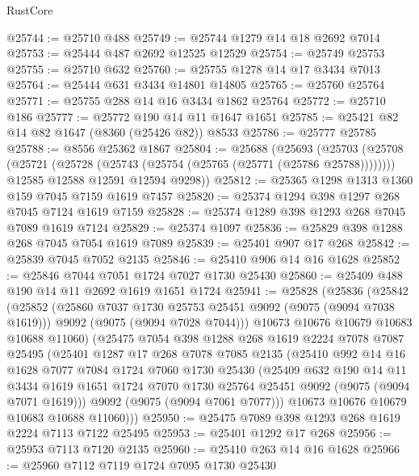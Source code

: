 \begin{lexlean}{RustCore}
\begin{coremodule}
@25744 := @25710 @488
@25749 := @25744 @1279 @14 @18 @2692 @7014
@25753 := @25444 @487 @2692 @12525 @12529
@25754 := @25749 @25753
@25755 := @25710 @632
@25760 := @25755 @1278 @14 @17 @3434 @7013
@25764 := @25444 @631 @3434 @14801 @14805
@25765 := @25760 @25764
@25771 := @25755 @288 @14 @16 @3434 @1862 @25764
@25772 := @25710 @186
@25777 := @25772 @190 @14 @11 @1647 @1651
@25785 := @25421 @82 @14 @82 @1647 (@8360 (@25426 @82)) @8533
@25786 := @25777 @25785
@25788 := @8556 @25362 @1867
@25804 := @25688
    (@25693
      (@25703
        (@25708 (@25721 (@25728 (@25743 (@25754 (@25765 (@25771 (@25786 @25788))))))))
        @12585
        @12588
        @12591
        @12594
        @9298))
@25812 := @25365 @1298 @1313 @1360 @159 @7045 @7159 @1619 @7457
@25820 := @25374 @1294 @398 @1297 @268 @7045 @7124 @1619 @7159
@25828 := @25374 @1289 @398 @1293 @268 @7045 @7089 @1619 @7124
@25829 := @25374 @1097
@25836 := @25829 @398 @1288 @268 @7045 @7054 @1619 @7089
@25839 := @25401 @907 @17 @268
@25842 := @25839 @7045 @7052 @2135
@25846 := @25410 @906 @14 @16 @1628
@25852 := @25846 @7044 @7051 @1724 @7027 @1730 @25430
@25860 := @25409 @488 @190 @14 @11 @2692 @1619 @1651 @1724
@25941 := @25828
    (@25836
      (@25842
        (@25852
          (@25860 @7037 @1730 @25753 @25451 @9092 (@9075 (@9094 @7038 @1619)))
          @9092
          (@9075 (@9094 @7028 @7044)))
        @10673
        @10676
        @10679
        @10683
        @10688
        @11060)
      (@25475
        @7054
        @398
        @1288
        @268
        @1619
        @2224
        @7078
        @7087
        @25495
        (@25401
          @1287
          @17
          @268
          @7078
          @7085
          @2135
          (@25410
            @992
            @14
            @16
            @1628
            @7077
            @7084
            @1724
            @7060
            @1730
            @25430
            (@25409
              @632
              @190
              @14
              @11
              @3434
              @1619
              @1651
              @1724
              @7070
              @1730
              @25764
              @25451
              @9092
              (@9075 (@9094 @7071 @1619)))
            @9092
            (@9075 (@9094 @7061 @7077)))
          @10673
          @10676
          @10679
          @10683
          @10688
          @11060)))
@25950 := @25475 @7089 @398 @1293 @268 @1619 @2224 @7113 @7122 @25495
@25953 := @25401 @1292 @17 @268
@25956 := @25953 @7113 @7120 @2135
@25960 := @25410 @263 @14 @16 @1628
@25966 := @25960 @7112 @7119 @1724 @7095 @1730 @25430

\end{coremodule}
\end{lexlean}
